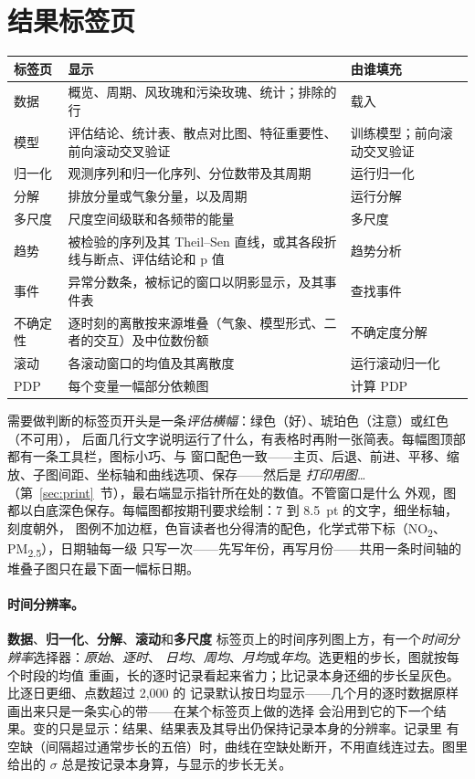 \documentclass[11pt]{ctexrep}
\newcommand{\tab}[1]{\textbf{#1}}
\newcommand{\NOtwo}{NO\textsubscript{2}}
\newcommand{\PMtwo}{PM\textsubscript{2.5}}
\begin{document}
\section{结果标签页}
\begin{center}\small
\begin{tabular}{@{}p{2.2cm}p{7.2cm}p{5.2cm}@{}}
\toprule
标签页 & 显示 & 由谁填充 \\
\midrule
数据     & 概览、周期、风玫瑰和污染玫瑰、统计；排除的行 & 载入 \\
模型     & 评估结论、统计表、散点对比图、特征重要性、前向滚动交叉验证 & 训练模型；前向滚动交叉验证 \\
归一化   & 观测序列和归一化序列、分位数带及其周期 & 运行归一化 \\
分解     & 排放分量或气象分量，以及周期 & 运行分解 \\
多尺度   & 尺度空间级联和各频带的能量 & 多尺度 \\
趋势     & 被检验的序列及其 Theil--Sen 直线，或其各段折线与断点、评估结论和 p 值 & 趋势分析 \\
事件     & 异常分数条，被标记的窗口以阴影显示，及其事件表 & 查找事件 \\
不确定性 & 逐时刻的离散按来源堆叠（气象、模型形式、二者的交互）及中位数份额 & 不确定度分解 \\
滚动     & 各滚动窗口的均值及其离散度 & 运行滚动归一化 \\
PDP      & 每个变量一幅部分依赖图 & 计算 PDP \\
\bottomrule
\end{tabular}
\end{center}
需要做判断的标签页开头是一条\emph{评估横幅}：绿色（好）、琥珀色（注意）或红色（不可用），
后面几行文字说明运行了什么，有表格时再附一张简表。每幅图顶部都有一条工具栏，图标小巧、与
窗口配色一致——主页、后退、前进、平移、缩放、子图间距、坐标轴和曲线选项、保存——然后是
\emph{打印用图…}（第~\ref{sec:print}~节），最右端显示指针所在处的数值。不管窗口是什么
外观，图都以白底深色保存。每幅图都按期刊要求绘制：7 到 8.5~pt 的文字，细坐标轴，刻度朝外，
图例不加边框，色盲读者也分得清的配色，化学式带下标（\NOtwo{}、\PMtwo{}），日期轴每一级
只写一次——先写年份，再写月份——共用一条时间轴的堆叠子图只在最下面一幅标日期。

\paragraph{时间分辨率。}\tab{数据}、\tab{归一化}、\tab{分解}、\tab{滚动}和\tab{多尺度}
标签页上的时间序列图上方，有一个\emph{时间分辨率}选择器：\emph{原始}、\emph{逐时}、
\emph{日均}、\emph{周均}、\emph{月均}或\emph{年均}。选更粗的步长，图就按每个时段的均值
重画，长的逐时记录看起来省力；比记录本身还细的步长呈灰色。比逐日更细、点数超过 2,000 的
记录默认按日均显示——几个月的逐时数据原样画出来只是一条实心的带——在某个标签页上做的选择
会沿用到它的下一个结果。变的只是显示：结果、结果表及其导出仍保持记录本身的分辨率。记录里
有空缺（间隔超过通常步长的五倍）时，曲线在空缺处断开，不用直线连过去。图里给出的 $\sigma$
总是按记录本身算，与显示的步长无关。
\end{document}
